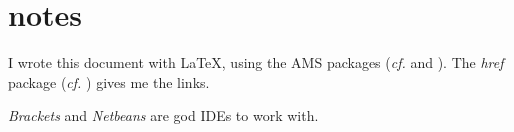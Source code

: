 
\section{notes}
I wrote this document with \LaTeX{}, using the AMS packages (\emph{cf.} \cite{bib:amsinstr} and \cite{bib:amsusersg}). The \emph{href} package (\emph{cf.} \cite{bib:hrefpack}) gives me the links.

\emph{Brackets} and \emph{Netbeans} are god IDEs to work with.
